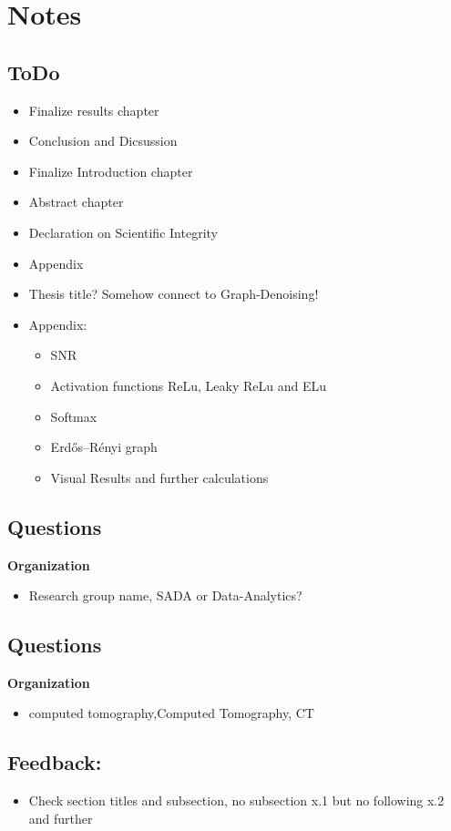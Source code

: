\chapter{Notes}

\section{ToDo}
\begin{itemize}
    \item Finalize results chapter
    \item Conclusion and Dicsussion
    \item Finalize Introduction chapter
    \item Abstract chapter
    \item Declaration on Scientific Integrity
    \item Appendix
    \item Thesis title? Somehow connect to Graph-Denoising!
    \item Appendix:
    \begin{itemize}
        \item SNR
        \item Activation functions ReLu,  Leaky ReLu and ELu
        \item Softmax
        \item Erdős–Rényi graph
        \item Visual Results and further calculations
    \end{itemize}
\end{itemize}

\section{Questions}
\textbf{Organization}
\begin{itemize}
    \item Research group name, SADA or Data-Analytics?
\end{itemize}


\section{Questions}
\textbf{Organization}
\begin{itemize}
    \item computed tomography,Computed Tomography, CT
\end{itemize}



\section{Feedback:}
\begin{itemize}
    \item Check section titles and subsection, no subsection x.1 but no following x.2 and further
\end{itemize}


\clearpage
